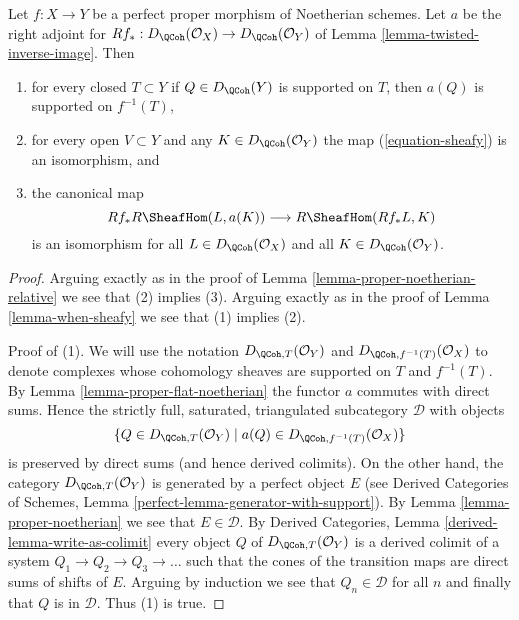 \begin{lemma}
\label{lemma-proper-flat-noetherian-relative}
Let $f : X \to Y$ be a perfect proper morphism of Noetherian schemes.
Let $a$ be the right adjoint for
$Rf_* : D_\QCoh(\mathcal{O}_X) \to D_\QCoh(\mathcal{O}_Y)$ of
Lemma \ref{lemma-twisted-inverse-image}. Then
\begin{enumerate}
\item for every closed $T \subset Y$ if $Q \in D_\QCoh(Y)$ is supported on $T$,
then $a(Q)$ is supported on $f^{-1}(T)$,
\item for every open $V \subset Y$ and any $K \in D_\QCoh(\mathcal{O}_Y)$
the map (\ref{equation-sheafy}) is an isomorphism, and
\item the canonical map
$$
Rf_*R\SheafHom(L, a(K)) \longrightarrow R\SheafHom(Rf_*L, K)
$$
is an isomorphism for all $L \in D_\QCoh(\mathcal{O}_X)$ and all
$K \in D_\QCoh(\mathcal{O}_Y)$.
\end{enumerate}
\end{lemma}

\begin{proof}
Arguing exactly as in the proof of
Lemma \ref{lemma-proper-noetherian-relative}
we see that (2) implies (3).
Arguing exactly as in the proof of
Lemma \ref{lemma-when-sheafy}
we see that (1) implies (2).

\medskip\noindent
Proof of (1). We will use the notation $D_{\QCoh, T}(\mathcal{O}_Y)$ and
$D_{\QCoh, f^{-1}(T)}(\mathcal{O}_X)$ to denote complexes
whose cohomology sheaves are supported on $T$ and $f^{-1}(T)$.
By Lemma \ref{lemma-proper-flat-noetherian} the functor $a$ commutes
with direct sums. Hence the strictly full, saturated, triangulated
subcategory $\mathcal{D}$ with objects
$$
\{Q \in D_{\QCoh, T}(\mathcal{O}_Y) \mid
a(Q) \in D_{\QCoh, f^{-1}(T)}(\mathcal{O}_X)\}
$$
is preserved by direct sums (and hence derived colimits).
On the other hand, the
category $D_{\QCoh, T}(\mathcal{O}_Y)$ is generated by a perfect
object $E$ (see Derived Categories of Schemes, Lemma
\ref{perfect-lemma-generator-with-support}).
By Lemma \ref{lemma-proper-noetherian} we see that $E \in \mathcal{D}$.
By Derived Categories, Lemma \ref{derived-lemma-write-as-colimit}
every object $Q$ of $D_{\QCoh, T}(\mathcal{O}_Y)$ is a derived
colimit of a system $Q_1 \to Q_2 \to Q_3 \to \ldots$
such that the cones of the transition maps are direct sums
of shifts of $E$. Arguing by induction we see that
$Q_n \in \mathcal{D}$ for all $n$ and finally that $Q$ is
in $\mathcal{D}$. Thus (1) is true.
\end{proof}

